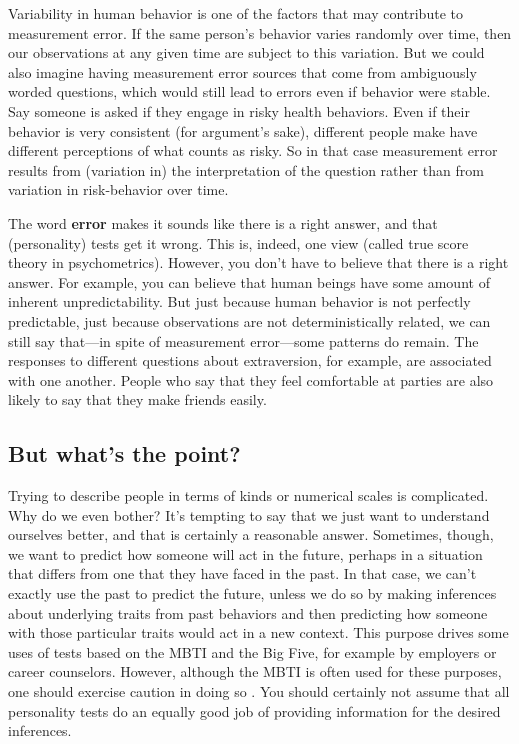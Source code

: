 \documentclass[
  openany]{book}
\begin{document}
Variability in human behavior is one of the factors that may contribute to measurement error. If the same person's behavior varies randomly over time, then our observations at any given time are subject to this variation. But we could also imagine having measurement error sources that come from ambiguously worded questions, which would still lead to errors even if behavior were stable. Say someone is asked if they engage in risky health behaviors. Even if their behavior is very consistent (for argument's sake), different people make have different perceptions of what counts as risky. So in that case measurement error results from (variation in) the interpretation of the question rather than from variation in risk-behavior over time.

The word \textbf{error} makes it sounds like there is a right answer, and that (personality) tests get it wrong. This is, indeed, one view (called true score theory in psychometrics). However, you don't have to believe that there is a right answer. For example, you can believe that human beings have some amount of inherent unpredictability. But just because human behavior is not perfectly predictable, just because observations are not deterministically related, we can still say that---in spite of measurement error---some patterns do remain. The responses to different questions about extraversion, for example, are associated with one another. People who say that they feel comfortable at parties are also likely to say that they make friends easily.

\hypertarget{but-whats-the-point}{%
\subsection*{But what's the point?}\label{but-whats-the-point}}

Trying to describe people in terms of kinds or numerical scales is complicated. Why do we even bother? It's tempting to say that we just want to understand ourselves better, and that is certainly a reasonable answer. Sometimes, though, we want to predict how someone will act in the future, perhaps in a situation that differs from one that they have faced in the past. In that case, we can't exactly use the past to predict the future, unless we do so by making inferences about underlying traits from past behaviors and then predicting how someone with those particular traits would act in a new context. This purpose drives some uses of tests based on the MBTI and the Big Five, for example by employers or career counselors. However, although the MBTI is often used for these purposes, one should exercise caution in doing so \citep{pittenger1993}. You should certainly not assume that all personality tests do an equally good job of providing information for the desired inferences.
\end{document}
